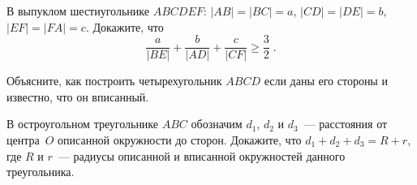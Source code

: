 \begin{problems}
\item
В выпуклом шестиугольнике $ABCDEF$:
$\lvert AB \rvert = \lvert BC \rvert = a$,
$\lvert CD \rvert = \lvert DE \rvert = b$,
$\lvert EF \rvert = \lvert FA \rvert = c$.
Докажите, что
\[
    \frac{a}{\lvert BE \rvert} +
    \frac{b}{\lvert AD \rvert} +
    \frac{c}{\lvert CF \rvert}
\geq
    \frac{3}{2}
\; . \]

\item
Объясните, как построить четырехугольник $ABCD$ если даны его стороны
и известно, что он вписанный.

\item
В остроугольном треугольнике $ABC$ обозначим $d_1$, $d_2$ и $d_3$~---
расстояния от центра~$O$ описанной окружности до сторон.
Докажите, что $d_1 + d_2 + d_3 = R + r$, где $R$ и $r$~--- радиусы описанной
и вписанной окружностей данного треугольника.

\end{problems}

\endgroup %

